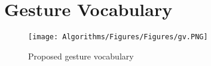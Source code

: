 
\chapter{Gesture Vocabulary} 
\label{chap:appendixA}


\begin{figure}
    \centering
    \texttt{[image: Algorithms/Figures/Figures/gv.PNG]}
    \caption{Proposed gesture vocabulary}
    \label{fig:gs}
\end{figure}

